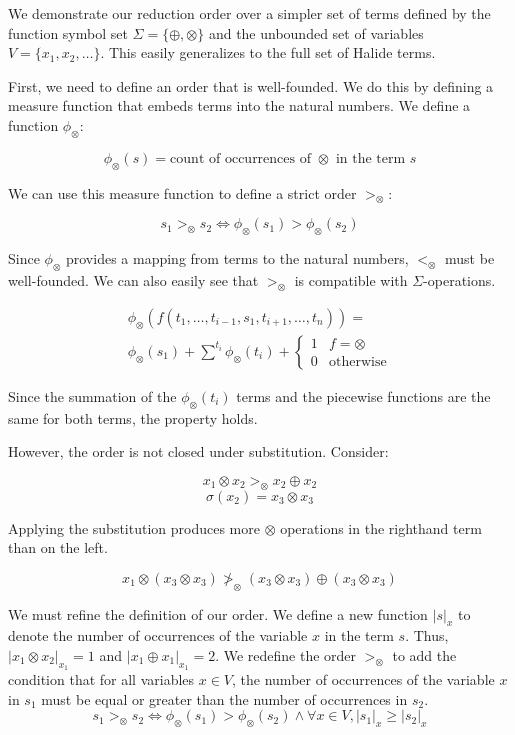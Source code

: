 \documentclass[sigplan,review,anonymous]{acmart}\settopmatter{printfolios=true,printccs=false,printacmref=false}
\begin{document}
We demonstrate our reduction order over a simpler set of terms defined by the function symbol set $\Sigma = \{\oplus, \otimes\}$ and the unbounded set of variables $V = \{x_1, x_2, \ldots \}$. This easily generalizes to the full set of Halide terms.

First, we need to define an order that is well-founded. We do this by defining a measure function that embeds terms into the natural numbers. We define a function $\phi_\otimes$:

\[
\phi_\otimes(s) = \textrm{count of occurrences of } \otimes \textrm{ in the term } s
\]

We can use this measure function to define a strict order $>_\otimes$:

\[
s_1 >_\otimes s_2 \iff \phi_\otimes(s_1) > \phi_\otimes(s_2)
\]

Since $\phi_\otimes$ provides a mapping from terms to the natural numbers, $<_\otimes$ must be well-founded. We can also easily see that $>_\otimes$ is compatible with $\Sigma$-operations.

\[
\begin{aligned}
\phi_\otimes(f(t_1, \ldots, t_{i-1}, s_1, t_{i+1}, \ldots, t_n)) = \\
\phi_\otimes(s_1) + \sum^{t_i} \phi_\otimes(t_i) + \begin{cases} 1 & f = \otimes \\
0 & \textrm{otherwise} \end{cases}
\end{aligned}
\]

Since the summation of the $\phi_\otimes(t_i)$ terms and the piecewise functions are the same for both terms, the property holds.

However, the order is not closed under substitution. Consider:

\[
x_1 \otimes x_2 >_\otimes x_2 \oplus x_2
\]
\[
\sigma(x_2) = x_3 \otimes x_3
\]

Applying the substitution produces more $\otimes$ operations in the righthand term than on the left.

\[
x_1 \otimes (x_3 \otimes x_3) \ngtr_\otimes (x_3 \otimes x_3) \oplus (x_3 \otimes x_3)
\]
 
We must refine the definition of our order. We define a new function $|s|_x$ to denote the number of occurrences of the variable $x$ in the term $s$. Thus, $|x_1 \otimes x_2|_{x_1} = 1$ and $|x_1 \oplus x_1|_{x_1} = 2$. We redefine the order $>_\otimes$ to add the condition that for all variables $x \in V$, the number of occurrences of the variable $x$ in $s_1$ must be equal or greater than the number of occurrences in $s_2$.
\[
s_1 >_\otimes s_2 \iff \phi_\otimes(s_1) > \phi_\otimes(s_2) \wedge \forall x \in V, |s_1|_x \geq |s_2|_x
\]
\end{document}
